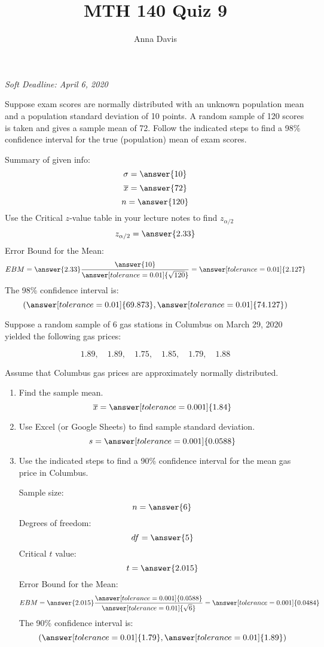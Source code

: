 \documentclass{ximera}
\author{Anna Davis} \title{MTH 140 Quiz 9}
\begin{document}
\begin{abstract}

\end{abstract}
\maketitle
 \textit{Soft Deadline: April 6, 2020}
\begin{problem}\label{prob:140quiz9prob1}
Suppose exam scores are normally distributed with an unknown population mean and a population standard deviation of 10 points. A random sample of 120 scores is taken and gives a sample mean of 72. Follow the indicated steps to find a 98\% confidence interval for the true (population) mean of exam scores.

Summary of given info:
$$\sigma=\answer{10}$$
$$\overline{x}=\answer{72}$$
$$n=\answer{120}$$
Use the Critical $z$-value table in your lecture notes to find $z_{\alpha/2}$
$$z_{\alpha/2}=\answer{2.33}$$
Error Bound for the Mean:
$$EBM=\answer{2.33}\frac{\answer{10}}{\answer[tolerance=0.01]{\sqrt{120}}}=\answer[tolerance=0.01]{2.127}$$
The 98\% confidence interval is:
$$(\answer[tolerance=0.01]{69.873},\answer[tolerance=0.01]{74.127})$$
\end{problem}

\begin{problem}\label{prob:140quiz9prob2}
Suppose a random sample of 6 gas stations in Columbus on March 29, 2020 yielded the following gas prices:

$$1.89,\quad 1.89,\quad 1.75,\quad 1.85,\quad 1.79,\quad 1.88$$

Assume that Columbus gas prices are approximately normally distributed.

\begin{enumerate}
    \item Find the sample mean.
    $$\overline{x}=\answer[tolerance=0.001]{1.84}$$
    \item Use Excel (or Google Sheets) to find sample standard deviation.
    $$s=\answer[tolerance=0.001]{0.0588}$$
   \item Use the indicated steps to find a 90\% confidence interval for the mean gas price in Columbus. 
   
   Sample size:
   $$n=\answer{6}$$
   Degrees of freedom:
   $$df=\answer{5}$$
   Critical $t$ value:
   $$t=\answer{2.015}$$
   Error Bound for the Mean:
   $$EBM=\answer{2.015}\frac{\answer[tolerance=0.001]{0.0588}}{\answer[tolerance=0.01]{\sqrt{6}}}=\answer[tolerance=0.001]{0.0484}$$
   The 90\% confidence interval is:
$$(\answer[tolerance=0.01]{1.79},\answer[tolerance=0.01]{1.89})$$
\end{enumerate}



\end{problem}
\end{document}
